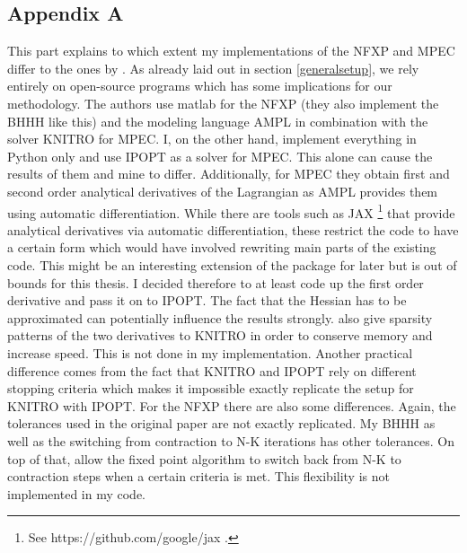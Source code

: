 

\thispagestyle{plain} %

\subsection{Appendix A} \label{appendixA}
\thispagestyle{plain} %

This part explains to which extent my implementations of the NFXP and MPEC differ to the ones by \cite{Iskhakov.2016}. As already laid out in section \ref{generalsetup}, we rely entirely on open-source programs which has some implications for our methodology. The authors use matlab for the NFXP (they also implement the BHHH like this) and the modeling language AMPL in combination with the solver KNITRO for MPEC. I, on the other hand, implement everything in Python only and use IPOPT as a solver for MPEC. This alone can cause the results of them and mine to differ. Additionally, for MPEC they obtain first and second order analytical derivatives of the Lagrangian as AMPL provides them using automatic differentiation. While there are tools such as JAX \footnote{See https://github.com/google/jax .} that provide analytical derivatives via automatic differentiation, these restrict the code to have a certain form which would have involved rewriting main parts of the existing code. This might be an interesting extension of the package for later but is out of bounds for this thesis. I decided therefore to at least code up the first order derivative and pass it on to IPOPT. The fact that the Hessian has to be approximated can potentially influence the results strongly. \citeauthor{Iskhakov.2016} also give sparsity patterns of the two derivatives to KNITRO in order to conserve memory and increase speed. This is not done in my implementation. Another practical difference comes from the fact that KNITRO and IPOPT rely on different stopping criteria which makes it impossible exactly replicate the setup for KNITRO with IPOPT. For the NFXP there are also some differences. Again, the tolerances used in the original paper are not exactly replicated. My BHHH as well as the switching from contraction to N-K iterations has other tolerances. On top of that, \citeauthor{Iskhakov.2016} allow the fixed point algorithm to switch back from N-K to contraction steps when a certain criteria is met. This flexibility is not implemented in my code. 

